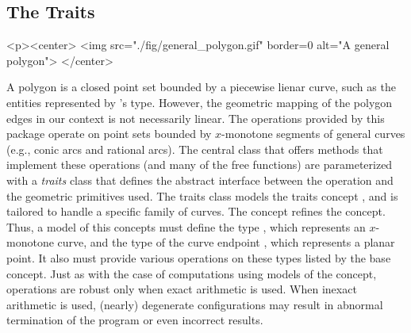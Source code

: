 \subsection{The Traits}
\label{bso_ssec:traits}
\begin{ccHtmlOnly}
  <p><center>
    <img src="./fig/general_polygon.gif" border=0 alt="A general polygon">
  </center>
\end{ccHtmlOnly}
A polygon is a closed point set bounded by a piecewise lienar curve, such
as the entities represented by \cgal 's  type. However,
the geometric mapping of the polygon edges in our context is not
necessarily linear. The operations provided by this package operate on
point sets bounded by $x$-monotone segments of general curves (e.g.,
conic arcs and rational arcs). The central class 
that offers methods that implement these operations (and many of the free
functions) are parameterized with a {\em traits} class that defines
the abstract interface between the operation and the geometric
primitives used. The traits class models the traits concept
, and is tailored to handle a specific
family of curves. The concept  refines
the  concept. Thus, a model of this
concepts must define the type , which
represents an $x$-monotone curve, and the type of the curve endpoint 
, which represents a planar point. It also must provide
various operations on these types listed by the base concept.
Just as with the case of computations using models of the 
 concept, operations are robust only
when exact arithmetic is used. When inexact arithmetic is used,
(nearly) degenerate configurations may result in abnormal termination
of the program or even incorrect results.


